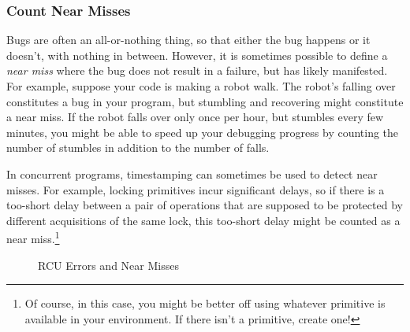 \subsubsection{Count Near Misses}
\label{sec:debugging:Count Near Misses}

Bugs are often an all-or-nothing thing, so that either the bug happens
or it doesn't, with nothing in between.
However, it is sometimes possible to define a \emph{near miss} where
the bug does not result in a failure, but has likely manifested.
For example, suppose your code is making a robot walk.
The robot's falling over constitutes a bug in your program, but
stumbling and recovering might constitute a near miss.
If the robot falls over only once per hour, but stumbles every few
minutes, you might be able to speed up your debugging progress by
counting the number of stumbles in addition to the number of falls.

In concurrent programs, timestamping can sometimes be used to detect
near misses.
For example, locking primitives incur significant delays, so if there is
a too-short delay between a pair of operations that are supposed
to be protected by different acquisitions of the same lock, this too-short
delay might be counted as a near miss.\footnote{
	Of course, in this case, you might be better off using
	whatever  primitive is available
	in your environment.
	If there isn't a  primitive, create one!}

\begin{figure}[tbp]
\begin{center}
\end{center}
\caption{RCU Errors and Near Misses}
\label{fig:debugging:RCU Errors and Near Misses}
\end{figure}

